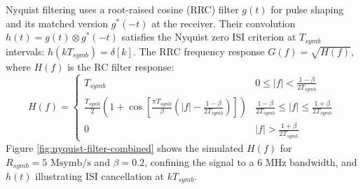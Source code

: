 \documentclass[11pt]{article}
\begin{document}
	Nyquist filtering uses a root-raised cosine (RRC) filter $g(t)$ for pulse shaping and its matched version $g^*(-t)$ at the receiver. Their convolution $h(t) = g(t) \otimes g^*(-t)$ satisfies the Nyquist zero ISI criterion at $T_{symb}$ intervals: $h(kT_{symb}) = \delta[k]$. The RRC frequency response $G(f) = \sqrt{H(f)}$, where $H(f)$ is the RC filter response:
	\begin{equation}
		H(f) = \begin{cases}
			T_{symb} & 0 \le |f| < \frac{1-\beta}{2T_{symb}} \\      
			\frac{T_{symb}}{2} \left(1 + \cos\left[\frac{\pi T_{symb}}{\beta}\left(|f| - \frac{1-\beta}{2T_{symb}}\right)\right]\right) & \frac{1-\beta}{2T_{symb}} \le |f| \le \frac{1+\beta}{2T_{symb}} \\      
			0 & |f| > \frac{1+\beta}{2T_{symb}}
		\end{cases}
	\end{equation}
	Figure \ref{fig:nyquist-filter-combined} shows the simulated $H(f)$ for $R_{symb} = 5 \text{ Msymb/s}$ and $\beta = 0.2$, confining the signal to a 6 MHz bandwidth, and $h(t)$ illustrating ISI cancellation at $kT_{symb}$.
	
\end{document}
